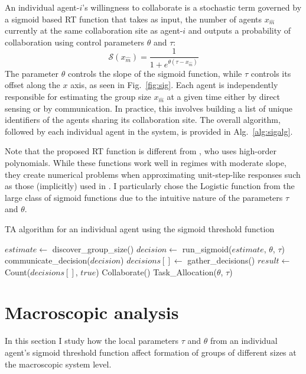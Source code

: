 \documentclass[defaultstyle,12pt]{thesis}
\newcommand{\Sig}{\mathcal{S}}  %
\newcommand{\xm}{x_{\hat{m}}}
\begin{document}
An individual agent-$i$'s willingness to collaborate is a stochastic term governed by a sigmoid based RT function that takes as input, the number of agents $\xm$ currently at the same collaboration site as agent-$i$ and outputs a probability of collaboration using control parameters $\theta$ and $\tau$:
\begin{equation}
	\Sig(\xm) = \frac{1}{1+e^{\theta(\tau - \xm)}}\label{eq:sig}
\end{equation}
The parameter $\theta$ controls the slope of the sigmoid function, while $\tau$ controls its offset along the $x$ axis, as seen in Fig.~\ref{fig:sig}. Each agent is independently responsible for estimating the group size $\xm$ at a given time either by direct sensing or by communication. In practice,  this involves building a list of unique identifiers of the agents sharing its collaboration site. The overall algorithm, followed by each individual agent in the system, is provided in Alg.~\ref{alg:sigalg}.

Note that the proposed RT function is different from \cite{Bonabeau1999}, who uses high-order polynomials. While these functions work well in regimes with moderate slope, they create numerical problems when approximating unit-step-like responses such as those (implicitly) used in \cite{Lerman2001}. I particularly chose the Logistic function from the large class of sigmoid functions due to the intuitive nature of the parameters $\tau$ and $\theta$. 

\begin{algorithm}
\caption{TA algorithm for an individual agent using the sigmoid threshold function}
\label{alg:sigalg}
\begin{algorithmic}
	\State $estimate \gets$ discover\_group\_size()
	\State $decision \gets$ run\_sigmoid($estimate$, $\theta$, $\tau$)
	\State communicate\_decision($decision$)
	\State $decisions[] \gets$ gather\_decisions()
	\State $result \gets$ Count($decisions[]$, $true$) 
		\State Collaborate()
		\State \Return
	\Else
		\State Task\_Allocation($\theta$, $\tau$)
	\EndIf
	\EndFunction
\end{algorithmic} 
\end{algorithm}

\section{Macroscopic analysis}\label{sec:macromodel}
In this section I study how the local parameters $\tau$ and $\theta$ from an individual agent's sigmoid threshold function affect formation of groups of different sizes at the macroscopic system level.
\end{document}
